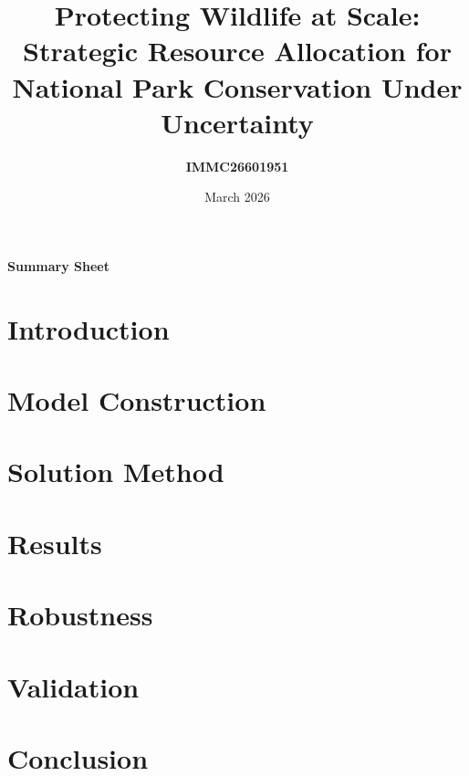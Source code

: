 \documentclass[10pt,a4paper]{article}
\title{\textbf{\Large Protecting Wildlife at Scale:}\\
\textbf{\large Strategic Resource Allocation for}\\
\textbf{\large National Park Conservation Under Uncertainty}}
\author{\textbf{IMMC26601951}}
\date{March 2026}
\theoremstyle{definition}
\theoremstyle{remark}
\begin{document}
\maketitle
\thispagestyle{empty}

\newpage
\thispagestyle{empty}
\vspace*{1.5cm}
\begin{center}
{\Large \textbf{Summary Sheet}}
\end{center}
\vspace{0.3cm}



\newpage
\tableofcontents

\newpage


\newpage
\setcounter{page}{1}

\section{Introduction}


\section{Model Construction}


\section{Solution Method}


\section{Results}


\section{Robustness}


\section{Validation}


\section{Conclusion}

\end{document}
